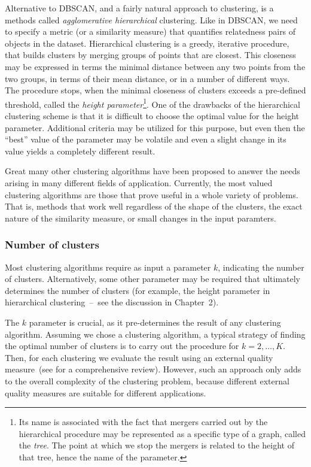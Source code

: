 \documentclass[a4paper,11pt,twoside]{book}%
\begin{document}
Alternative to DBSCAN, and a fairly natural approach to clustering, is a methods called \emph{agglomerative hierarchical} clustering.
Like in DBSCAN, we need to specify a metric (or a similarity measure) that quantifies relatedness pairs of objects in the dataset.
Hierarchical clustering is a greedy, iterative procedure, that builds clusters by merging groups of points that are closest.
This closeness may be expressed in terms the minimal distance between any two points from the two groups, in terms of their mean distance, or in a number of different ways.
The procedure stops, when the minimal closeness of clusters exceeds a pre-defined threshold, called the \emph{height parameter}\footnote{
Its name is associated with the fact that mergers carried out by the hierarchical procedure may be represented as a specific type of a graph, called the \emph{tree}.
The point at which we stop the mergers is related to the height of that tree, hence the name of the parameter.}.
One of the drawbacks of the hierarchical clustering scheme is that it is difficult to choose the optimal value for the height parameter.
Additional criteria may be utilized for this purpose, but even then the ``best'' value of the parameter may be volatile and even a slight change in its value yields a completely different result.

Great many other clustering algorithms have been proposed to answer the needs arising in many different fields of application.
Currently, the most valued clustering algorithms are those that prove useful in a whole variety of problems.
That is, methods that work well regardless of the shape of the clusters, the exact nature of the similarity measure, or small changes in the input paramters.

\subsubsection{Number of clusters}

Most clustering algorithms require as input a parameter $k$, indicating the number of clusters.
Alternatively, some other parameter may be required that ultimately determines the number of clusters (for example, the height parameter in hierarchical clustering~--~see the discussion in Chapter~2).

The $k$ parameter is crucial, as it pre-determines the result of any clustering algorithm.
Assuming we chose a clustering algorithm, a typical strategy of finding the optimal number of clusters is to carry out the procedure for $k=2,\ldots,K$.
Then, for each clustering we evaluate the result using an external quality measure~(see \cite{wu2009external} for a comprehensive review).
However, such an approach only adds to the overall complexity of the clustering problem, because different external quality measures are suitable for different applications.
\end{document}
